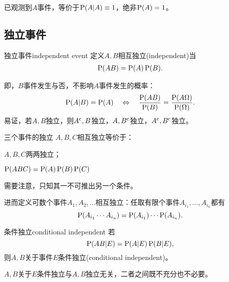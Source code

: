 已观测到$A$事件，等价于$\P(A|A)\equiv 1$，绝非$\P(A)=1$。

\subsection{独立事件}
\begin{definition}{独立事件}{independent event}
	定义$A,B$相互独立(independent)当
	\begin{align}
		\P(AB)=\P(A)\P(B).
	\end{align}
\end{definition}
即，$B$事件发生与否，不影响$A$事件发生的概率：
\[
	\P(A|B)=\P(A)\ifnf\frac{\P(AB)}{\P(B)}=\frac{\P(A\Omega)}{\P(\Omega)}.
\]
易证，若$A,B$独立，则$A\c,B$独立，$A,B\c$独立，$A\c,B\c$独立。
\begin{definition}{三个事件的独立}{}
	$A,B,C$相互独立等价于：
	\begin{compactenum}
		\item $A,B,C$两两独立；
		\item $\P(ABC)=\P(A)\P(B)\P(C)$
	\end{compactenum}
\end{definition}
需要注意，只知其一不可推出另一个条件。

进而定义可数个事件$A_1,A_2,\ldots$相互独立：任取有限个事件$A_{i_1},\ldots,A_{i_n}$都有
\[
	\P(A_{i_1}\cdots A_{i_n})=\P(A_{i_1})\cdots\P(A_{i_n}).
\]
\begin{definition}{条件独立}{conditional independent}
	若
	\[
		\P(AB|E)=\P(A|E)\P(B|E),
	\]
	则$A,B$关于事件$E$条件独立(conditional independent)。
\end{definition}
$A,B$关于$E$条件独立与$A,B$独立无关，二者之间既不充分也不必要。
